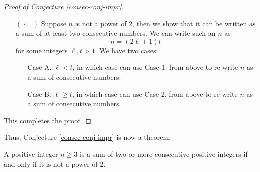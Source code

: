 \begin{example}
\begin{proof}[Proof of Conjecture \ref{consec-conj-impr}]
\begin{itemize}[itemsep=2em]
\begin{itemize}[leftmargin=4em]
\item[Case 2.] Suppose $n$ is a sum of even-many, say $2t \geq 2$, consecutive positive integers. Then, we write $n$ as
\[n = \underbrace{(\ell - t + 1) + \cdots + (\ell - 1) + \ell}_{\text{$t$ terms}} + \underbrace{(\ell + 1) + (\ell + 2) + \cdots + (\ell + t)}_{\text{$\ell$ terms}}\]
Since these are positive integers, we get $\ell - (t - 1) > 0$, or equivalently $\ell \geq t$.
Re-arranging, we have
\begin{align*}
n &= (\ell - (t - 1)) + \cdots + (\ell - 1) + \ell + (\ell + 1) + (\ell + 2) + \cdots + (\ell + t)\\[0.5em]
 &= (\ell - t + 1) + (\ell + t) + \cdots + (\ell - 1) + (\ell + 2) + \ell + (\ell + 1)\\[0.5em]
 &= \underbrace{(2\ell + 1) + \cdots + (2\ell + 1) + (2\ell + 1)}_{\text{$t$ terms}}\\[0.5em]
 &= (2\ell + 1)t
\end{align*}
Thus $n$ has an odd factor $2\ell + 1 \geq 3$.
\end{itemize}
\item[$(\Leftarrow)$] Suppose $n$ is not a power of $2$, then we show that it can be written as a sum of at least two consecutive numbers. We can write such an $n$ as
\[n = (2\ell + 1)t\]
for some integers $\ell, t > 1$. We have two cases:
\begin{itemize}[leftmargin=4em]
\item[Case A.] $\ell < t$, in which case can use Case 1. from above to re-write $n$ as a sum of consecutive numbers.

\item[Case B.] $\ell \geq t$, in which case can use Case 2. from above to re-write $n$ as a sum of consecutive numbers.
\end{itemize}
\end{itemize}
This completes the proof.
\end{proof}

\vspace*{1em}

Thus, Conjecture \ref{consec-conj-impr} is now a theorem. 
\begin{theorem}\label{thm:consec-conj}
A positive integer $n \geq 3$ is a sum of two or more consecutive positive integers if and only if it is not a power of $2$.
\end{theorem}

\vspace*{1em}


\end{example}
